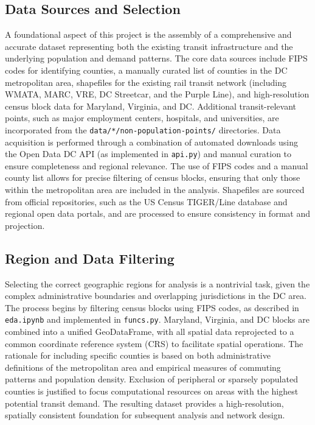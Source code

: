 \documentclass[manuscript,screen,review]{acmart}
\begin{document}
\subsection{Data Sources and Selection}
A foundational aspect of this project is the assembly of a comprehensive and accurate dataset representing both the existing transit infrastructure and the underlying population and demand patterns. The core data sources include FIPS codes for identifying counties, a manually curated list of counties in the DC metropolitan area, shapefiles for the existing rail transit network (including WMATA, MARC, VRE, DC Streetcar, and the Purple Line), and high-resolution census block data for Maryland, Virginia, and DC. Additional transit-relevant points, such as major employment centers, hospitals, and universities, are incorporated from the \texttt{data/*/non-population-points/} directories. Data acquisition is performed through a combination of automated downloads using the Open Data DC API (as implemented in \texttt{api.py}) and manual curation to ensure completeness and regional relevance. The use of FIPS codes and a manual county list allows for precise filtering of census blocks, ensuring that only those within the metropolitan area are included in the analysis. Shapefiles are sourced from official repositories, such as the US Census TIGER/Line database and regional open data portals, and are processed to ensure consistency in format and projection.

\subsection{Region and Data Filtering}
Selecting the correct geographic regions for analysis is a nontrivial task, given the complex administrative boundaries and overlapping jurisdictions in the DC area. The process begins by filtering census blocks using FIPS codes, as described in \texttt{eda.ipynb} and implemented in \texttt{funcs.py}. Maryland, Virginia, and DC blocks are combined into a unified GeoDataFrame, with all spatial data reprojected to a common coordinate reference system (CRS) to facilitate spatial operations. The rationale for including specific counties is based on both administrative definitions of the metropolitan area and empirical measures of commuting patterns and population density. Exclusion of peripheral or sparsely populated counties is justified to focus computational resources on areas with the highest potential transit demand. The resulting dataset provides a high-resolution, spatially consistent foundation for subsequent analysis and network design.
\end{document}
